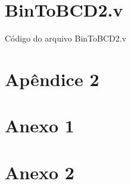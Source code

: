 \documentclass[
	12pt,				%
	openright,			%
	a4paper,			%
	english,			%
	french,				%
	spanish,			%
	brazilian,				%
	]{abntex2}
\begin{document}
\begin{apendicesenv}

\partapendices

\chapter{BinToBCD2.v}
\label{code:BinToBCD2.v}
Código do arquivo BinToBCD2.v
 

\chapter{Apêndice 2}


\end{apendicesenv}



\begin{anexosenv}

\partanexos

\chapter{Anexo 1}

\chapter{Anexo 2}

\end{anexosenv}



\printindex
\end{document}
